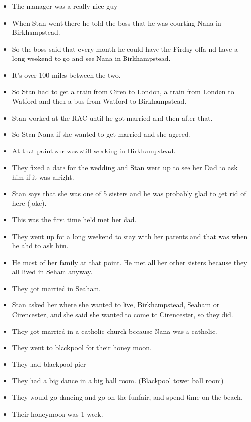 \documentclass[10pt,twocolumn,letterpaper]{article}
\begin{document}
\begin{itemize}
\begin{itemize}
        \item The manager was a really nice guy
        \item When Stan went there he told the boss that he was courting Nana in Birkhampstead.
        \item So the boss said that every month he could have the Firday offa nd have a long weekend to go and see Nana in Birkhampstead.
        \item It's over 100 miles between the two.
        \item So Stan had to get a train from Ciren to London, a train from London to Watford and then a bus from Watford to Birkhampstead.
        \item Stan worked at the RAC until he got married and then after that.
        \item So Stan Nana if she wanted to get married and she agreed.
        \item At that point she was still working in Birkhampstead.
        \item They fixed a date for the wedding and Stan went up to see her Dad to ask him if it was alright.
        \item Stan says that she was one of 5 sisters and he was probably glad to get rid of here (joke).
        \item This was the first time he'd met her dad.
        \item They went up for a long weekend to stay with her parents and that was when he ahd to ask him.
        \item He most of her family at that point. He met all her other sisters because they all lived in Seham anyway.
        \item They got married in Seaham.
        \item Stan asked her where she wanted to live, Birkhampstead, Seaham or Cirencester, and she said she wanted to come to Cirencester, so they did. 
        \item They got married in a catholic church because Nana was a catholic.
        \item They went to blackpool for their honey moon. 
        \item They had blackpool pier
        \item They had a big dance in a big ball room. (Blackpool tower ball room)
        \item They would go dancing and go on the funfair, and spend time on the beach.
        \item Their honeymoon was 1 week.

\end{itemize}
\end{itemize}
\end{document}
